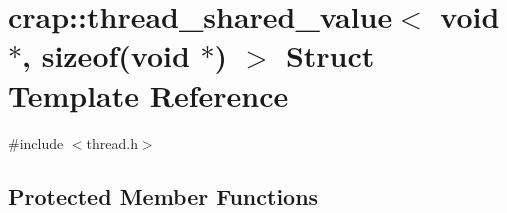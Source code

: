 \hypertarget{structcrap_1_1thread__shared__value_3_01void_01_5_00_01sizeof_07void_01_5_08_01_4}{\section{crap\+:\+:thread\+\_\+shared\+\_\+value$<$ void $\ast$, sizeof(void $\ast$) $>$ Struct Template Reference}
\label{structcrap_1_1thread__shared__value_3_01void_01_5_00_01sizeof_07void_01_5_08_01_4}
}


{\ttfamily \#include $<$thread.\+h$>$}

\subsection*{Protected Member Functions}
